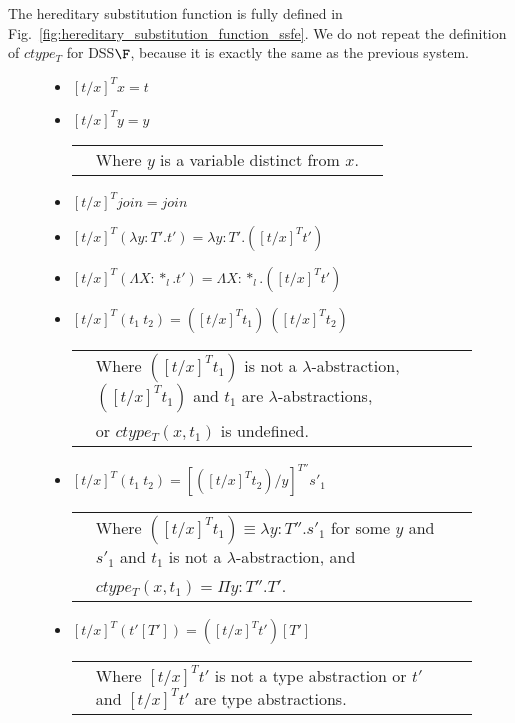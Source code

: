 The hereditary substitution function is fully defined in
Fig.~\ref{fig:hereditary_substitution_function_ssfe}.  We do not
repeat the definition of $ctype_T$ for DSS$\F$, because it is
exactly the same as the previous system. 
\begin{figure}[t]
  \small
  \begin{itemize}
  \item[] $[t/x]^T x = t$

  \item[] $[t/x]^T y = y$\\
    \begin{tabular}{lll}
      & Where $y$ is a variable distinct from $x$.\\
    \end{tabular}

  \item[] $[t/x]^T join = join$

  \item[] $[t/x]^T (\lambda y:T'.t') = \lambda y:T'.([t/x]^T t')$

  \item[] $[t/x]^T (\Lambda X:*_l.t') = \Lambda X:*_l.([t/x]^T t')$

  \item[] $[t/x]^T (t_1\ t_2) = ([t/x]^T t_1)\ ([t/x]^T t_2)$\\
    \begin{tabular}{lll}
      & Where $([t/x]^T t_1)$ is not a $\lambda$-abstraction, 
      $([t/x]^T t_1)$ and $t_1$ are $\lambda$-abstractions,\\ 
      & or $ctype_T(x,t_1)$ is undefined.
    \end{tabular}

  \item[] $[t/x]^{T} (t_1\ t_2) = [([t/x]^{T} t_2)/y]^{T''} s'_1$\\
    \begin{tabular}{lll}
      & Where $([t/x]^{T} t_1) \equiv \lambda y:T''.s'_1$ 
        for some $y$ and $s'_1$ and $t_1$ is not a $\lambda$-abstraction, and \\
      & $ctype_T(x,t_1) = \Pi y:T''.T'$.\\
    \end{tabular}

  \item[] $[t/x]^T (t'[T']) = ([t/x]^T t')[T']$\\
    \begin{tabular}{lll}
      & Where $[t/x]^T t'$ is not a type abstraction or
      $t'$ and $[t/x]^T t'$ are type abstractions.
    \end{tabular}


\end{itemize}
\end{figure}
